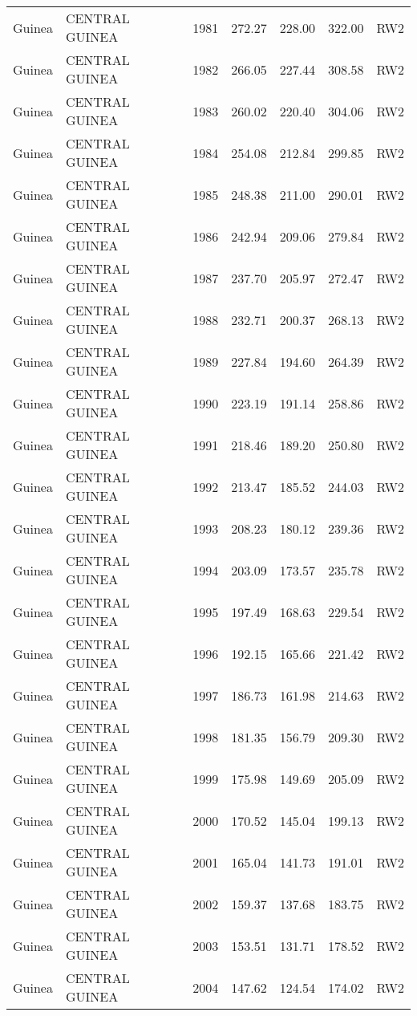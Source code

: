 \begin{longtable}{lllrrrl}
  Guinea & CENTRAL GUINEA & 1981 & 272.27 & 228.00 & 322.00 & RW2 \\ 
  Guinea & CENTRAL GUINEA & 1982 & 266.05 & 227.44 & 308.58 & RW2 \\ 
  Guinea & CENTRAL GUINEA & 1983 & 260.02 & 220.40 & 304.06 & RW2 \\ 
  Guinea & CENTRAL GUINEA & 1984 & 254.08 & 212.84 & 299.85 & RW2 \\ 
  Guinea & CENTRAL GUINEA & 1985 & 248.38 & 211.00 & 290.01 & RW2 \\ 
  Guinea & CENTRAL GUINEA & 1986 & 242.94 & 209.06 & 279.84 & RW2 \\ 
  Guinea & CENTRAL GUINEA & 1987 & 237.70 & 205.97 & 272.47 & RW2 \\ 
  Guinea & CENTRAL GUINEA & 1988 & 232.71 & 200.37 & 268.13 & RW2 \\ 
  Guinea & CENTRAL GUINEA & 1989 & 227.84 & 194.60 & 264.39 & RW2 \\ 
  Guinea & CENTRAL GUINEA & 1990 & 223.19 & 191.14 & 258.86 & RW2 \\ 
  Guinea & CENTRAL GUINEA & 1991 & 218.46 & 189.20 & 250.80 & RW2 \\ 
  Guinea & CENTRAL GUINEA & 1992 & 213.47 & 185.52 & 244.03 & RW2 \\ 
  Guinea & CENTRAL GUINEA & 1993 & 208.23 & 180.12 & 239.36 & RW2 \\ 
  Guinea & CENTRAL GUINEA & 1994 & 203.09 & 173.57 & 235.78 & RW2 \\ 
  Guinea & CENTRAL GUINEA & 1995 & 197.49 & 168.63 & 229.54 & RW2 \\ 
  Guinea & CENTRAL GUINEA & 1996 & 192.15 & 165.66 & 221.42 & RW2 \\ 
  Guinea & CENTRAL GUINEA & 1997 & 186.73 & 161.98 & 214.63 & RW2 \\ 
  Guinea & CENTRAL GUINEA & 1998 & 181.35 & 156.79 & 209.30 & RW2 \\ 
  Guinea & CENTRAL GUINEA & 1999 & 175.98 & 149.69 & 205.09 & RW2 \\ 
  Guinea & CENTRAL GUINEA & 2000 & 170.52 & 145.04 & 199.13 & RW2 \\ 
  Guinea & CENTRAL GUINEA & 2001 & 165.04 & 141.73 & 191.01 & RW2 \\ 
  Guinea & CENTRAL GUINEA & 2002 & 159.37 & 137.68 & 183.75 & RW2 \\ 
  Guinea & CENTRAL GUINEA & 2003 & 153.51 & 131.71 & 178.52 & RW2 \\ 
  Guinea & CENTRAL GUINEA & 2004 & 147.62 & 124.54 & 174.02 & RW2 \\ 

\end{longtable}
